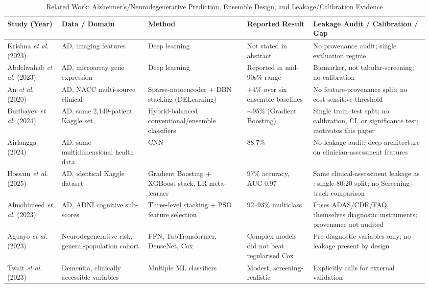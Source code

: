 \documentclass[conference]{IEEEtran}
\begin{document}
\begin{table}[!t]
\caption{Related Work: Alzheimer's/Neurodegenerative Prediction, Ensemble Design, and Leakage/Calibration Evidence}
\label{tab:relatedwork}
\centering
\footnotesize
\begin{tabular}{@{}p{2.6cm}p{2.6cm}p{3.3cm}p{2.7cm}p{4.3cm}@{}}
\toprule
\textbf{Study (Year)} & \textbf{Data / Domain} & \textbf{Method} & \textbf{Reported Result} & \textbf{Leakage Audit / Calibration / Gap} \\
\midrule
Krishna \textit{et al.} \cite{b1} (2023) & AD, imaging features & Deep learning & Not stated in abstract & No provenance audit; single evaluation regime \\
Abdelwahab \textit{et al.} \cite{b2} (2023) & AD, microarray gene expression & Deep learning & Reported in mid-90s\% range & Biomarker, not tabular-screening; no calibration \\
An \textit{et al.} \cite{b36} (2020) & AD, NACC multi-source clinical & Sparse-autoencoder + DBN stacking (DELearning) & +4\% over six ensemble baselines & No feature-provenance split; no cost-sensitive threshold \\
Buribayev \textit{et al.} \cite{b13} (2024) & AD, same 2{,}149-patient Kaggle set & Hybrid-balanced conventional/ensemble classifiers & $\sim$95\% (Gradient Boosting) & Single train--test split; no calibration, CI, or significance test; motivates this paper \\
Airlangga \cite{b20} (2024) & AD, same multidimensional health data & CNN & 88.7\% & No leakage audit; deep architecture on clinician-assessment features \\
Hossain \textit{et al.} \cite{b37} (2025) & AD, identical Kaggle dataset & Gradient Boosting + XGBoost stack, LR meta-learner & 97\% accuracy, AUC 0.97 & Same clinical-assessment leakage as \cite{b13}; single 80:20 split; no Screening-track comparison \\
Almohimeed \textit{et al.} \cite{b38} (2023) & AD, ADNI cognitive sub-scores & Three-level stacking + PSO feature selection & 92--93\% multiclass & Fuses ADAS/CDR/FAQ, themselves diagnostic instruments; provenance not audited \\
Aguayo \textit{et al.} \cite{b26} (2023) & Neurodegenerative risk, general-population cohort & FFN, TabTransformer, DenseNet, Cox & Complex models did not beat regularised Cox & Pre-diagnostic variables only; no leakage present by design \\
Twait \textit{et al.} \cite{b27} (2023) & Dementia, clinically accessible variables & Multiple ML classifiers & Modest, screening-realistic & Explicitly calls for external validation \\

\end{tabular}
\end{table}
\end{document}
